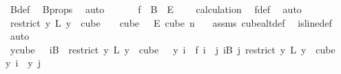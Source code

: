 \begin{isabellebody}
\ B{\isacharunderscore}{\kern0pt}def\ \isamarkupfalse%
\ B{\isacharunderscore}{\kern0pt}props\ \isamarkupfalse%
\ auto\isanewline
\ \ \isamarkupfalse%
\ \isamarkupfalse%
\ {\isachardoublequoteopen}\ f\ {\isasymin}\ B\ {}\ {\isasymrightarrow}\isactrlsub E\ {\isacharbraceleft}{\kern0pt}{\isachardot}{\kern0pt}{\isachardot}{\kern0pt}{\isacharless}{\kern0pt}{}{\isacharbraceright}{\kern0pt}{\isachardoublequoteclose}\ \isamarkupfalse%
\ {\isacharasterisk}{\kern0pt}\ calculation{\isacharparenleft}{\kern0pt}{}{\isacharparenright}{\kern0pt}\ \isamarkupfalse%
\ f{\isacharunderscore}{\kern0pt}def\ \isamarkupfalse%
\ auto\isanewline
\ \ \isamarkupfalse%
\ \isamarkupfalse%
\ {\isachardoublequoteopen}{\isacharparenleft}{\kern0pt}restrict\ {\isacharparenleft}{\kern0pt}{\isasymlambda}y{\isachardot}{\kern0pt}\ L\ {\isacharparenleft}{\kern0pt}y\ {}{\isacharparenright}{\kern0pt}{\isacharparenright}{\kern0pt}\ {\isacharparenleft}{\kern0pt}cube\ {}\ {}{\isacharparenright}{\kern0pt}{\isacharparenright}{\kern0pt}\ {\isasymin}\ cube\ {}\ {}\ {\isasymrightarrow}\isactrlsub E\ cube\ n\ {}{\isachardoublequoteclose}\ \isamarkupfalse%
\ assms{\isacharparenleft}{\kern0pt}{}{\isacharparenright}{\kern0pt}\ cube{}{\isacharunderscore}{\kern0pt}alt{\isacharunderscore}{\kern0pt}def\ \isamarkupfalse%
\ is{\isacharunderscore}{\kern0pt}line{\isacharunderscore}{\kern0pt}def\ \isamarkupfalse%
\ auto\isanewline
\ \ \isamarkupfalse%
\ \isamarkupfalse%
\ {\isachardoublequoteopen}{\isacharparenleft}{\kern0pt}{\isasymforall}y{\isasymin}cube\ {}\ {}{\isachardot}{\kern0pt}\ {\isacharparenleft}{\kern0pt}{\isasymforall}i{\isasymin}B\ {}{\isachardot}{\kern0pt}\ {\isacharparenleft}{\kern0pt}restrict\ {\isacharparenleft}{\kern0pt}{\isasymlambda}y{\isachardot}{\kern0pt}\ L\ {\isacharparenleft}{\kern0pt}y\ {}{\isacharparenright}{\kern0pt}{\isacharparenright}{\kern0pt}\ {\isacharparenleft}{\kern0pt}cube\ {}\ {}{\isacharparenright}{\kern0pt}{\isacharparenright}{\kern0pt}\ y\ i\ {\isacharequal}{\kern0pt}\ f\ i{\isacharparenright}{\kern0pt}\ {\isasymand}\ {\isacharparenleft}{\kern0pt}{\isasymforall}j{\isacharless}{\kern0pt}{}{\isachardot}{\kern0pt}\ {\isasymforall}i{\isasymin}B\ j{\isachardot}{\kern0pt}\ {\isacharparenleft}{\kern0pt}restrict\ {\isacharparenleft}{\kern0pt}{\isasymlambda}y{\isachardot}{\kern0pt}\ L\ {\isacharparenleft}{\kern0pt}y\ {}{\isacharparenright}{\kern0pt}{\isacharparenright}{\kern0pt}\ {\isacharparenleft}{\kern0pt}cube\ {}\ {}{\isacharparenright}{\kern0pt}{\isacharparenright}{\kern0pt}\ y\ i\ {\isacharequal}{\kern0pt}\ y\ j{\isacharparenright}{\kern0pt}{\isacharparenright}{\kern0pt}{\isachardoublequoteclose}\ \isamarkupfalse%

\end{isabellebody}
